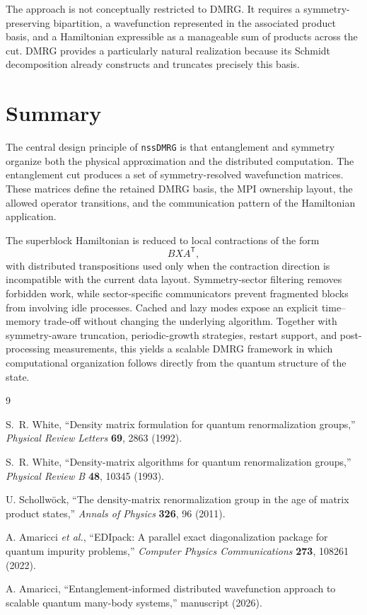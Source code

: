 \documentclass[11pt,a4paper]{article}
\begin{document}
The approach is not conceptually restricted to DMRG.  It requires a
symmetry-preserving bipartition, a wavefunction represented in the associated
product basis, and a Hamiltonian expressible as a manageable sum of products
across the cut.  DMRG provides a particularly natural realization because its
Schmidt decomposition already constructs and truncates precisely this basis.

\section{Summary}

The central design principle of \texttt{nssDMRG} is that entanglement and
symmetry organize both the physical approximation and the distributed
computation.  The entanglement cut produces a set of symmetry-resolved
wavefunction matrices.  These matrices define the retained DMRG basis, the
MPI ownership layout, the allowed operator transitions, and the communication
pattern of the Hamiltonian application.

The superblock Hamiltonian is reduced to local contractions of the form
\begin{equation}
  BXA^{\mathsf T},
\end{equation}
with distributed transpositions used only when the contraction direction is
incompatible with the current data layout.  Symmetry-sector filtering removes
forbidden work, while sector-specific communicators prevent fragmented blocks
from involving idle processes.  Cached and lazy modes expose an explicit
time--memory trade-off without changing the underlying algorithm.  Together
with symmetry-aware truncation, periodic-growth strategies, restart support,
and post-processing measurements, this yields a scalable DMRG framework in
which computational organization follows directly from the quantum structure
of the state.

\begin{thebibliography}{9}

S.~R. White,
``Density matrix formulation for quantum renormalization groups,''
\emph{Physical Review Letters} \textbf{69}, 2863 (1992).

S.~R. White,
``Density-matrix algorithms for quantum renormalization groups,''
\emph{Physical Review B} \textbf{48}, 10345 (1993).

U. Schollw\"ock,
``The density-matrix renormalization group in the age of matrix product
states,''
\emph{Annals of Physics} \textbf{326}, 96 (2011).

A. Amaricci \emph{et al.},
``EDIpack: A parallel exact diagonalization package for quantum impurity
problems,''
\emph{Computer Physics Communications} \textbf{273}, 108261 (2022).

A. Amaricci,
``Entanglement-informed distributed wavefunction approach to scalable quantum
many-body systems,'' manuscript (2026).

\end{thebibliography}
\end{document}

